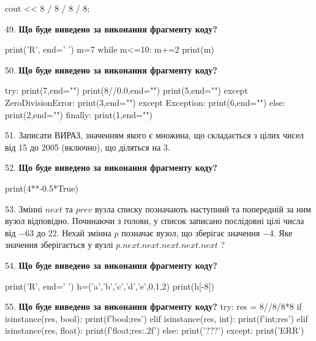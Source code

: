 \documentclass[11pt]{article}
\begin{document}
cout << 8 / 8 / 8 / 8;
\par\vspace{5mm}

49. \textbf{Що буде виведено за виконання фрагменту коду?}

print('R', end=' ')
m=7
while m<=10:
    m+=2
print(m)

\par\vspace{5mm}

50. \textbf{Що буде виведено за виконання фрагменту коду?}

try:
    print(7,end="")
    print(8//0.0,end="")
    print(5,end="")
except ZeroDivisionError: print(3,end="")
except Exception: print(6,end="")
else: print(2,end="")
finally: print(1,end="")
\par\vspace{5mm}

51. 
Записати ВИРАЗ, значенням якого є множина, що складається з цілих чисел від 15 до 2005 (включно), що діляться на 3.\par\vspace{5mm}

52. \textbf{Що буде виведено за виконання фрагменту коду?}

print(4**-0.5*True)
\par\vspace{5mm}

53. 
Змінні $next$ та $prev$ вузла списку позначають наступний та попередній за ним вузол відповідно. Починаючи з голови, у список записано послідовні цілі числа від $-63$ до $22$. Нехай змінна $p$ позначає вузол, що зберігає значення $-4$.
Яке значення зберігається у вузлі $p.next.next.next.next.next$ ?
\par\vspace{5mm}

54. \textbf{Що буде виведено за виконання фрагменту коду?}

print('R', end=' ')
h=('a','b','c','d','e',0,1,2)
print(h[-8])

\par\vspace{5mm}

55. \textbf{Що буде виведено за виконання фрагменту коду?}
try:
    res = 8//8/8*8
    if isinstance(res, bool):
        print(f'bool;{res}')
    elif isinstance(res, int):
        print(f'int;{res}')
    elif isinstance(res, float):
        print(f'float;{res:.2f}')
    else:
        print('???')
except:
    print('ERR')
\par\vspace{5mm}
\end{document}
